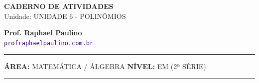 \documentclass[twoside, 10pt, a4paper]{article}
\begin{document}
\thispagestyle{empty}
\color{Cinzablack}
\vspace*{-1.8cm}

\noindent
\begin{minipage}{\textwidth}
    \selectfont
    \noindent
    \begin{minipage}[t]{0.70\linewidth}
        {\Large \bfseries \MakeUppercase{Caderno de Atividades}}\\[0.1cm]
        {\large \textmd{\textcolor{CinzaEscuro}{Unidade: UNIDADE 6 - POLINÔMIOS}}}
    \end{minipage}%
    \begin{minipage}[t]{0.30\linewidth}
        \raggedleft
        \small \textbf{Prof. Raphael Paulino}\\
        \textsf{\small \textcolor{indigo}{\texttt{profraphaelpaulino.com.br}}}
    \end{minipage}
    
    \vspace{0.15cm}
    \noindent\rule{\linewidth}{1.2pt}
    \vspace{-0.1cm}
    \footnotesize\textsf{\textbf{ÁREA:} MATEMÁTICA / ÁLGEBRA \hfill \textbf{NÍVEL:} EM (2ª SÉRIE)}
    \vspace{0.1cm}
    \noindent\rule{\linewidth}{0.4pt}
\end{minipage}
\end{document}
